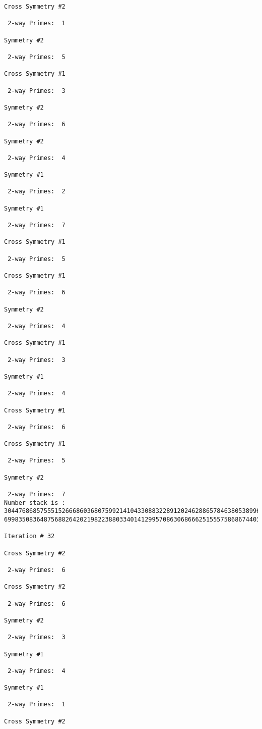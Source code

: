 {{{{\begin{verbatim}
Cross Symmetry #2

 2-way Primes: 	1

Symmetry #2

 2-way Primes: 	5

Cross Symmetry #1

 2-way Primes: 	3

Symmetry #2

 2-way Primes: 	6

Symmetry #2

 2-way Primes: 	4

Symmetry #1

 2-way Primes: 	2

Symmetry #1

 2-way Primes: 	7

Cross Symmetry #1

 2-way Primes: 	5

Cross Symmetry #1

 2-way Primes: 	6

Symmetry #2

 2-way Primes: 	4

Cross Symmetry #1

 2-way Primes: 	3

Symmetry #1

 2-way Primes: 	4

Cross Symmetry #1

 2-way Primes: 	6

Cross Symmetry #1

 2-way Primes: 	5

Symmetry #2

 2-way Primes: 	7
Number stack is :
30447686857555152666860368075992141043308832289120246288657846380538996794608835958544046240163340857
69983508364875688264202198223880334014129957086306866625155575868674403758043361042640445859538806497

Iteration #	32

Cross Symmetry #2

 2-way Primes: 	6

Cross Symmetry #2

 2-way Primes: 	6

Symmetry #2

 2-way Primes: 	3

Symmetry #1

 2-way Primes: 	4

Symmetry #1

 2-way Primes: 	1

Cross Symmetry #2


\end{verbatim}}}}}
